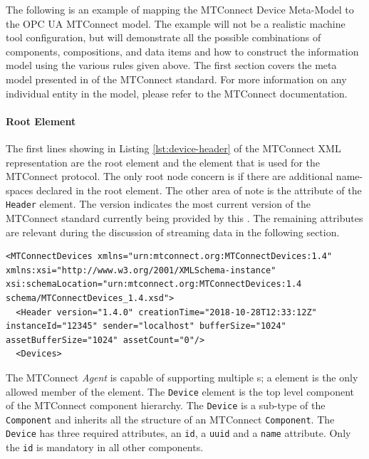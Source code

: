 The following is an example of mapping the MTConnect Device Meta-Model to the OPC UA MTConnect model. The example will not be a realistic machine tool configuration, but will demonstrate all the possible combinations of components, compositions, and data items and how to construct the information model using the various rules given above. The first section covers the meta model presented in \cite{MTCPart2} of the MTConnect standard. For more information on any individual entity in the model, please refer to the MTConnect documentation.

\paragraph{ Root Element}

The first lines showing in Listing \ref{lst:device-header} of the MTConnect XML representation are the root element  and the  element that is used for the MTConnect protocol. The only root node concern is if there are additional name-spaces declared in the root  element. The other area of note is the  attribute of the \texttt{Header} element.  The version indicates the most current version of the MTConnect standard currently being provided by this . The remaining attributes are relevant during the discussion of streaming data in the following section.

\begin{lstlisting}[caption={Device Header},label={lst:device-header}]
<MTConnectDevices xmlns="urn:mtconnect.org:MTConnectDevices:1.4" xmlns:xsi="http://www.w3.org/2001/XMLSchema-instance" xsi:schemaLocation="urn:mtconnect.org:MTConnectDevices:1.4 schema/MTConnectDevices_1.4.xsd">
  <Header version="1.4.0" creationTime="2018-10-28T12:33:12Z" instanceId="12345" sender="localhost" bufferSize="1024" assetBufferSize="1024" assetCount="0"/>
  <Devices>
\end{lstlisting}

The MTConnect \textit{Agent} is capable of supporting multiple s; a  element is the only allowed member of the  element. The \texttt{Device} element is the top level component of the MTConnect component hierarchy. The \texttt{Device} is a sub-type of the \texttt{Component} and inherits all the structure of an MTConnect \texttt{Component}. The \texttt{Device} has three required attributes, an \texttt{id}, a \texttt{uuid} and a \texttt{name} attribute. Only the \texttt{id} is mandatory in all other components. 

